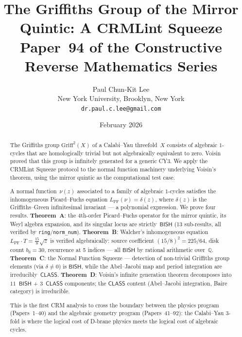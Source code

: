 \documentclass[11pt]{article}
\theoremstyle{plain}
\theoremstyle{definition}
\theoremstyle{remark}
\newcommand{\Q}{\mathbb{Q}}
\newcommand{\Griff}{\mathrm{Griff}}
\newcommand{\BISH}{\ensuremath{\mathsf{BISH}}}
\newcommand{\CLASS}{\ensuremath{\mathsf{CLASS}}}
\begin{document}
\title{The Griffiths Group of the Mirror Quintic: A CRMLint Squeeze\\[6pt]
\large Paper~94 of the Constructive Reverse Mathematics Series}

\author{Paul Chun-Kit Lee\\
\small New York University, Brooklyn, New York\\
\small \texttt{dr.paul.c.lee@gmail.com}}

\date{February 2026}

\maketitle

\begin{abstract}
The Griffiths group $\Griff^2(X)$ of a Calabi--Yau threefold~$X$ consists of algebraic $1$-cycles that are homologically trivial but not algebraically equivalent to zero. Voisin proved that this group is infinitely generated for a generic CY3. We apply the CRMLint Squeeze protocol to the normal function machinery underlying Voisin's theorem, using the mirror quintic as the computational test case.

A normal function~$\nu(z)$ associated to a family of algebraic $1$-cycles satisfies the inhomogeneous Picard--Fuchs equation $L_{\mathrm{PF}}(\nu) = \delta(z)$, where $\delta(z)$ is the Griffiths--Green infinitesimal invariant --- a polynomial expression. We prove four results.
\textbf{Theorem~A}: the 4th-order Picard--Fuchs operator for the mirror quintic, its Weyl algebra expansion, and its singular locus are strictly~$\BISH$ (13 sub-results, all verified by \texttt{ring}/\texttt{norm\_num}).
\textbf{Theorem~B}: Walcher's inhomogeneous equation $L_{\mathrm{PF}} \cdot T = \tfrac{15}{8}\sqrt{z}$ is verified algebraically: source coefficient $(15/8)^2 = 225/64$, disk count $b_0 = 30$, recurrence at 5 indices --- all $\BISH$ by rational arithmetic over~$\Q$.
\textbf{Theorem~C}: the Normal Function Squeeze --- detection of non-trivial Griffiths group elements (via $\delta \neq 0$) is $\BISH$, while the Abel--Jacobi map and period integration are irreducibly~$\CLASS$.
\textbf{Theorem~D}: Voisin's infinite generation theorem decomposes into $11$~$\BISH$ + $3$~$\CLASS$ components; the $\CLASS$ content (Abel--Jacobi integration, Baire category) is irreducible.

This is the first CRM analysis to cross the boundary between the physics program (Papers~1--40) and the algebraic geometry program (Papers~41--92): the Calabi--Yau 3-fold is where the logical cost of D-brane physics meets the logical cost of algebraic cycles.
\end{abstract}
\end{document}
